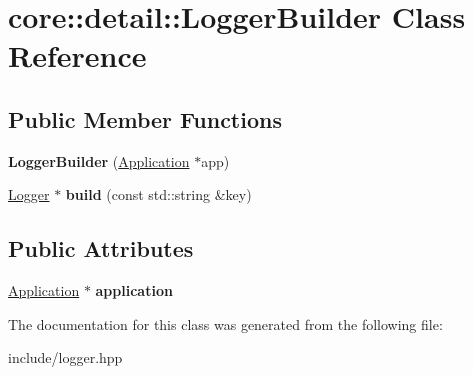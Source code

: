 \hypertarget{classcore_1_1detail_1_1_logger_builder}{\section{core\-:\-:detail\-:\-:Logger\-Builder Class Reference}
\label{classcore_1_1detail_1_1_logger_builder}
}
\subsection*{Public Member Functions}
\begin{DoxyCompactItemize}
\item 
\hypertarget{classcore_1_1detail_1_1_logger_builder_a58770ea6e87eba131106bd8bbc308609}{{\bfseries Logger\-Builder} (\hyperlink{classcore_1_1_application}{Application} $\ast$app)}\label{classcore_1_1detail_1_1_logger_builder_a58770ea6e87eba131106bd8bbc308609}

\item 
\hypertarget{classcore_1_1detail_1_1_logger_builder_a6939014597b7eeed7ae8c3522a5c0ae6}{\hyperlink{classcore_1_1_logger}{Logger} $\ast$ {\bfseries build} (const std\-::string \&key)}\label{classcore_1_1detail_1_1_logger_builder_a6939014597b7eeed7ae8c3522a5c0ae6}

\end{DoxyCompactItemize}
\subsection*{Public Attributes}
\begin{DoxyCompactItemize}
\item 
\hypertarget{classcore_1_1detail_1_1_logger_builder_abbe7e07fda4cd26caa17ac0b051e3481}{\hyperlink{classcore_1_1_application}{Application} $\ast$ {\bfseries application}}\label{classcore_1_1detail_1_1_logger_builder_abbe7e07fda4cd26caa17ac0b051e3481}

\end{DoxyCompactItemize}


The documentation for this class was generated from the following file\-:\begin{DoxyCompactItemize}
\item 
include/logger.\-hpp\end{DoxyCompactItemize}
